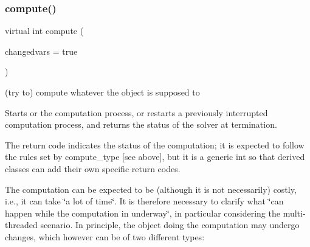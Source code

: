 \subsubsection{\texorpdfstring{compute()}{compute()}}
{\footnotesize\ttfamily virtual int compute (\begin{DoxyParamCaption}\item[{bool}]{changedvars = {\ttfamily true} }\end{DoxyParamCaption})\hspace{0.3cm}{\ttfamily [pure virtual]}}



(try to) compute whatever the object is supposed to 

Starts or the computation process, or restarts a previously interrupted computation process, and returns the status of the solver at termination.

The return code indicates the status of the computation; it is expected to follow the rules set by compute\+\_\+type \mbox{[}see above\mbox{]}, but it is a generic int so that derived classes can add their own specific return codes.

The computation can be expected to be (although it is not necessarily) costly, i.\+e., it can take \char`\"{}a lot of time\char`\"{}. It is therefore necessary to clarify what \char`\"{}can happen while the computation in underway\char`\"{}, in particular considering the multi-\/threaded scenario. In principle, the object doing the computation may undergo changes, which however can be of two different types\+:


